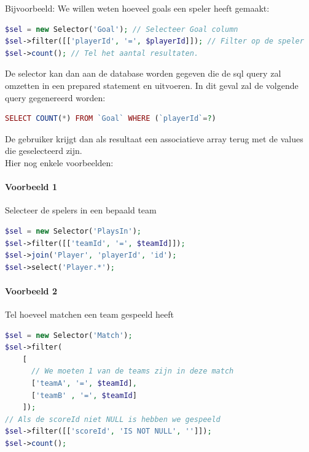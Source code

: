 \documentclass[11pt]{article}
\begin{document}
Bijvoorbeeld: We willen weten hoeveel goals een speler heeft gemaakt:
\begin{framed}
\begin{lstlisting}[language=php]
$sel = new Selector('Goal'); // Selecteer Goal column
$sel->filter([['playerId', '=', $playerId]]); // Filter op de speler
$sel->count(); // Tel het aantal resultaten.
\end{lstlisting}
\end{framed}


De selector kan dan aan de database worden gegeven die de sql query zal omzetten in een prepared statement en uitvoeren.
In dit geval zal de volgende query gegenereerd worden:
\begin{framed}
\begin{lstlisting}[language=php]
SELECT COUNT(*) FROM `Goal` WHERE (`playerId`=?)
\end{lstlisting}
\end{framed}

De gebruiker krijgt dan als resultaat een associatieve array terug met de values die geselecteerd zijn.\\

Hier nog enkele voorbeelden:

\paragraph{Voorbeeld 1}

Selecteer de spelers in een bepaald team
\begin{framed}
\begin{lstlisting}[language=php]
$sel = new Selector('PlaysIn');
$sel->filter([['teamId', '=', $teamId]]);
$sel->join('Player', 'playerId', 'id');
$sel->select('Player.*');
\end{lstlisting}
\end{framed}

\paragraph{Voorbeeld 2}

Tel hoeveel matchen een team gespeeld heeft
\begin{framed}
\begin{lstlisting}[language=php]
$sel = new Selector('Match');
$sel->filter(
    [
      // We moeten 1 van de teams zijn in deze match
      ['teamA', '=', $teamId],
      ['teamB' , '=', $teamId]
    ]);
// Als de scoreId niet NULL is hebben we gespeeld
$sel->filter([['scoreId', 'IS NOT NULL', '']]);
$sel->count();
\end{lstlisting}
\end{framed}
\end{document}
